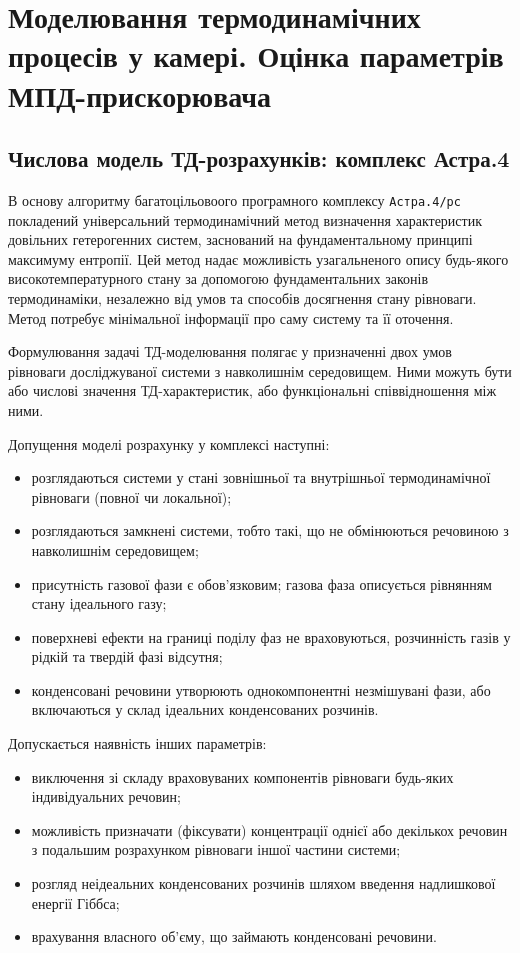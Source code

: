 \chapter{Моделювання термодинамічних процесів у камері. Оцінка параметрів МПД-прискорювача}\label{sec:model_conditions}

\section{Числова модель ТД-розрахунків: комплекс Астра.4}


В основу алгоритму багатоцільовоого програмного комплексу \texttt{Астра.4/рс} покладений універсальний термодинамічний метод визначення характеристик довільних гетерогенних систем, заснований на фундаментальному принципі максимуму ентропії. Цей метод надає можливість узагальненого опису будь-якого високотемпературного стану за допомогою фундаментальних законів термодинаміки, незалежно від умов та способів досягнення стану рівноваги. Метод потребує мінімальної інформації про саму систему та її оточення.

Формулювання задачі ТД-моделювання полягає у призначенні двох умов рівноваги досліджуваної системи з навколишнім середовищем. Ними можуть бути або числові значення ТД-характеристик, або функціональні співвідношення між ними.

Допущення моделі розрахунку у комплексі наступні:
\begin{itemize}
	\item розглядаються системи у стані зовнішньої та внутрішньої термодинамічної рівноваги (повної чи локальної);
	\item розглядаються замкнені системи, тобто такі, що не обмінюються речовиною з навколишнім середовищем;
	\item присутність газової фази є обов'язковим; газова фаза описується рівнянням стану ідеального газу;
	\item поверхневі ефекти на границі поділу фаз не враховуються, розчинність газів у рідкій та твердій фазі відсутня;
	\item конденсовані речовини утворюють однокомпонентні незмішувані фази, або включаються у склад ідеальних конденсованих розчинів.
\end{itemize}

Допускається наявність інших параметрів:
\begin{itemize}
	\item виключення зі складу враховуваних компонентів рівноваги будь-яких індивідуальних речовин;
	\item можливість призначати (фіксувати) концентрації однієї або декількох речовин з подальшим розрахунком рівноваги іншої частини системи;
	\item розгляд неідеальних конденсованих розчинів шляхом введення надлишкової енергії Гіббса;
	\item врахування власного об'єму, що займають конденсовані речовини.
\end{itemize}

